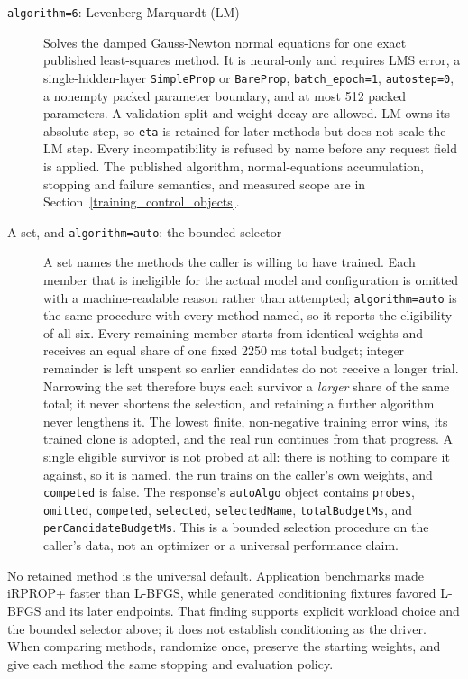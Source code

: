 \begin{description}
\item[\texttt{algorithm=6}: Levenberg-Marquardt (LM)]
      Solves the damped Gauss-Newton normal equations for one exact published
      least-squares method. It is neural-only and requires LMS error, a
      single-hidden-layer \texttt{SimpleProp} or \texttt{BareProp},
      \texttt{batch\_epoch=1}, \texttt{autostep=0}, a nonempty packed
      parameter boundary, and at most 512 packed parameters. A validation split
      and weight decay are allowed. LM owns its absolute step, so \texttt{eta}
      is retained for later methods but does not scale the LM step. Every
      incompatibility is refused by name before any request field is applied.
      The published algorithm, normal-equations accumulation, stopping and
      failure semantics, and measured scope are in
      Section~\ref{training_control_objects}.
\item[A set, and \texttt{algorithm=auto}: the bounded selector]
      A set names the methods the caller is willing to have trained. Each
      member that is ineligible for the actual model and configuration is
      omitted with a machine-readable reason rather than attempted;
      \texttt{algorithm=auto} is the same procedure with every method named, so
      it reports the eligibility of all six. Every remaining member starts from
      identical weights and receives an equal share of one fixed 2250 ms total
      budget; integer remainder is left unspent so earlier candidates do not
      receive a longer trial. Narrowing the set therefore buys each survivor a
      \emph{larger} share of the same total; it never shortens the selection,
      and retaining a further algorithm never lengthens it. The lowest finite,
      non-negative training error wins, its trained clone is adopted, and the real run
      continues from that progress. A single eligible survivor is not probed at
      all: there is nothing to compare it against, so it is named, the run
      trains on the caller's own weights, and \texttt{competed} is false. The
      response's \texttt{autoAlgo} object contains \texttt{probes},
      \texttt{omitted}, \texttt{competed}, \texttt{selected},
      \texttt{selectedName}, \texttt{totalBudgetMs}, and
      \texttt{perCandidateBudgetMs}. This is a bounded selection procedure on
      the caller's data, not an optimizer or a universal performance claim.
\end{description}

No retained method is the universal default. Application benchmarks made
iRPROP+ faster than L-BFGS, while generated conditioning fixtures favored
L-BFGS and its later endpoints. That finding supports explicit workload choice
and the bounded selector above; it does not establish conditioning as the
driver. When comparing methods, randomize once, preserve the starting weights,
and give each method the same stopping and evaluation policy.


